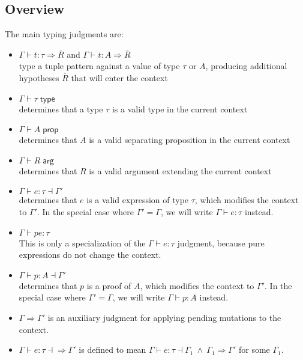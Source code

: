 \documentclass[acmsmall,nonacm]{acmart}
\newcommand{\proves}{\vdash}
\newcommand{\makes}{\dashv}
\newcommand{\constep}{\Rightarrow}
\newcommand{\makesto}{\dashv\!\constep}
\begin{document}
\subsection{Overview}

The main typing judgments are:

\begin{itemize}
  \item $\Gamma \proves t:\tau \Rightarrow \overline{R}$ and $\Gamma \proves t:A\Rightarrow \overline{R}$\\ type a tuple pattern against a value of type $\tau$ or $A$, producing additional hypotheses $\overline{R}$ that will enter the context
  \item $\Gamma \proves \tau\;\mathsf{type}$\\ determines that a type $\tau$ is a valid type in the current context
  \item $\Gamma \proves A\;\mathsf{prop}$\\ determines that $A$ is a valid separating proposition in the current context
  \item $\Gamma \proves R\;\mathsf{arg}$\\ determines that $R$ is a valid argument extending the current context
  \item $\Gamma \proves e:\tau \makes\Gamma'$\\ determines that $e$ is a valid expression of type $\tau$, which modifies the context to $\Gamma'$. In the special case where $\Gamma'=\Gamma$, we will write $\Gamma \proves e:\tau$ instead.
  \item $\Gamma \proves pe:\tau$\\ This is only a specialization of the $\Gamma \proves e:\tau$ judgment, because pure expressions do not change the context.
  \item $\Gamma \proves p:A \makes\Gamma'$\\ determines that $p$ is a proof of $A$, which modifies the context to $\Gamma'$. In the special case where $\Gamma'=\Gamma$, we will write $\Gamma \proves p:A$ instead.
  \item $\Gamma \constep \Gamma'$ is an auxiliary judgment for applying pending mutations to the context.
  \item $\Gamma \proves e:\tau\makesto\Gamma'$ is defined to mean $\Gamma \proves e:\tau\makes\Gamma_1\ \wedge\ \Gamma_1\constep\Gamma'$ for some $\Gamma_1$.
\end{itemize}
\end{document}
